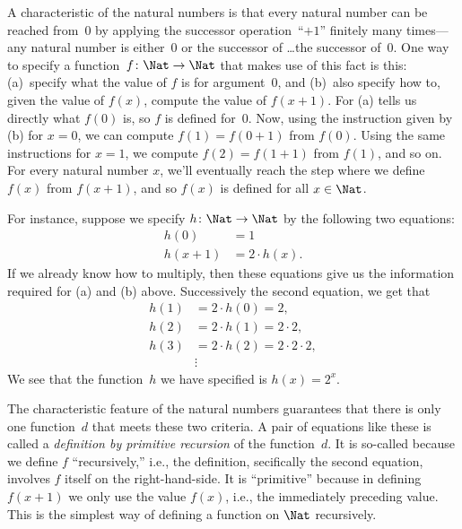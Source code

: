 \documentclass[../../../include/open-logic-section]{subfiles}
\begin{document}

A characteristic of the natural numbers is that every natural number
can be reached from~$0$ by applying the successor operation~``$+1$''
finitely many times---any natural number is either~$0$ or the
successor of \dots the successor of~$0$. One way to specify a
function~$f\colon\Nat \to \Nat$ that makes use of this fact is this:
(a)~specify what the value of $f$ is for argument~$0$, and (b)~also
specify how to, given the value of $f(x)$, compute the value of
$f(x+1)$. For (a) tells us directly what $f(0)$ is, so $f$ is defined
for~$0$. Now, using the instruction given by (b) for $x=0$, we can
compute $f(1) = f(0+1)$ from $f(0)$. Using the same instructions for
$x=1$, we compute $f(2) = f(1+1)$ from $f(1)$, and so on. For every
natural number $x$, we'll eventually reach the step where we define
$f(x)$ from $f(x+1)$, and so $f(x)$ is defined for all $x \in \Nat$.

For instance, suppose we specify $h\colon \Nat \to \Nat$ by the following
two equations:
\begin{align*}
h(0) & =  1 \\
h(x+1) & =  2 \cdot h(x).
\end{align*}
If we already know how to multiply, then these equations give us the
information required for (a) and (b) above. Successively the second
equation, we get that
\begin{align*}
  h(1) & = 2\cdot h(0) = 2,\\
  h(2) & = 2\cdot h(1) = 2\cdot 2,\\
  h(3) & = 2 \cdot h(2) = 2\cdot 2 \cdot 2,\\
  & \vdots
\end{align*}
We see that the function~$h$ we have specified is $h(x) = 2^x$.

The characteristic feature of the natural numbers guarantees that
there is only one function~$d$ that meets these two criteria.  A pair
of equations like these is called a \emph{definition by primitive
  recursion} of the function~$d$. It is so-called because we define
$f$ ``recursively,'' i.e., the definition, secifically the second
equation, involves $f$ itself on the right-hand-side. It is
``primitive'' because in defining $f(x+1)$ we only use the value
$f(x)$, i.e., the immediately preceding value. This is the simplest
way of defining a function on $\Nat$ recursively.
\end{document}
